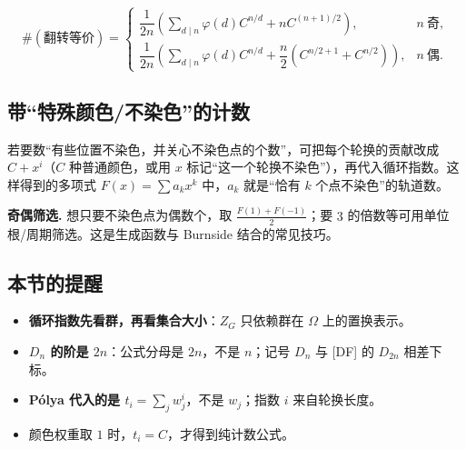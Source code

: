 \[
\#(\text{翻转等价})=
\begin{cases}
\dfrac{1}{2n}\left(\sum_{d\mid n}\varphi(d)C^{n/d}+nC^{(n+1)/2}\right), & n\ \text{奇},\\[6pt]
\dfrac{1}{2n}\left(\sum_{d\mid n}\varphi(d)C^{n/d}+\dfrac n2\left(C^{n/2+1}+C^{n/2}\right)\right), & n\ \text{偶}.
\end{cases}
\]

\subsection{带“特殊颜色/不染色”的计数}


若要数“有些位置不染色，并关心不染色点的个数”，可把每个轮换的贡献改成 $C+x^i$（$C$ 种普通颜色，或用 $x$ 标记“这一个轮换不染色”），再代入循环指数。这样得到的多项式 $F(x)=\sum a_kx^k$ 中，$a_k$ 就是“恰有 $k$ 个点不染色”的轨道数。

\textbf{奇偶筛选.} 想只要不染色点为偶数个，取 $\frac{F(1)+F(-1)}2$；要 $3$ 的倍数等可用单位根/周期筛选。这是生成函数与 Burnside 结合的常见技巧。

\subsection{本节的提醒}


\begin{itemize}
\item \textbf{循环指数先看群，再看集合大小}：$Z_G$ 只依赖群在 $\Omega$ 上的置换表示。
\item \textbf{$D_n$ 的阶是 $2n$}：公式分母是 $2n$，不是 $n$；记号 $D_n$ 与 [DF] 的 $D_{2n}$ 相差下标。
\item \textbf{Pólya 代入的是 $t_i=\sum_j w_j^i$}，不是 $w_j$；指数 $i$ 来自轮换长度。
\item 颜色权重取 $1$ 时，$t_i=C$，才得到纯计数公式。
\end{itemize}

